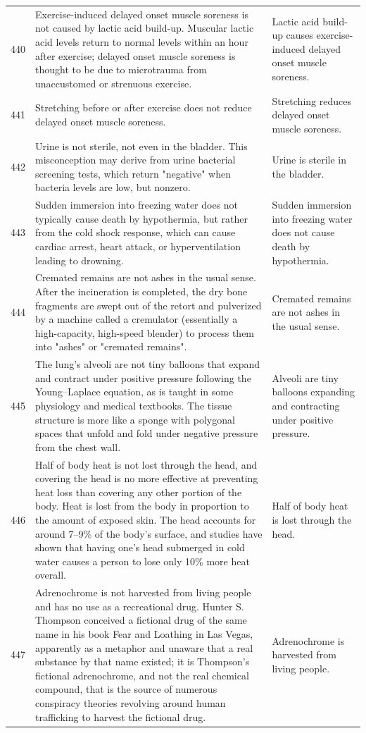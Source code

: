 \begin{tabular}{c|p{}|p{}}
440 & Exercise-induced delayed onset muscle soreness is not caused by lactic acid build-up. Muscular lactic acid levels return to normal levels within an hour after exercise; delayed onset muscle soreness is thought to be due to microtrauma from unaccustomed or strenuous exercise. & Lactic acid build-up causes exercise-induced delayed onset muscle soreness. \\
441 & Stretching before or after exercise does not reduce delayed onset muscle soreness. & Stretching reduces delayed onset muscle soreness. \\
442 & Urine is not sterile, not even in the bladder. This misconception may derive from urine bacterial screening tests, which return "negative" when bacteria levels are low, but nonzero. & Urine is sterile in the bladder. \\
443 & Sudden immersion into freezing water does not typically cause death by hypothermia, but rather from the cold shock response, which can cause cardiac arrest, heart attack, or hyperventilation leading to drowning. & Sudden immersion into freezing water does not cause death by hypothermia. \\
444 & Cremated remains are not ashes in the usual sense. After the incineration is completed, the dry bone fragments are swept out of the retort and pulverized by a machine called a cremulator (essentially a high-capacity, high-speed blender) to process them into "ashes" or "cremated remains". & Cremated remains are not ashes in the usual sense. \\
445 & The lung's alveoli are not tiny balloons that expand and contract under positive pressure following the Young–Laplace equation, as is taught in some physiology and medical textbooks. The tissue structure is more like a sponge with polygonal spaces that unfold and fold under negative pressure from the chest wall. & Alveoli are tiny balloons expanding and contracting under positive pressure. \\
446 & Half of body heat is not lost through the head, and covering the head is no more effective at preventing heat loss than covering any other portion of the body. Heat is lost from the body in proportion to the amount of exposed skin. The head accounts for around 7–9\% of the body's surface, and studies have shown that having one's head submerged in cold water causes a person to lose only 10\% more heat overall. & Half of body heat is lost through the head. \\
447 & Adrenochrome is not harvested from living people and has no use as a recreational drug. Hunter S. Thompson conceived a fictional drug of the same name in his book Fear and Loathing in Las Vegas, apparently as a metaphor and unaware that a real substance by that name existed; it is Thompson's fictional adrenochrome, and not the real chemical compound, that is the source of numerous conspiracy theories revolving around human trafficking to harvest the fictional drug. & Adrenochrome is harvested from living people. \\

\end{tabular}
